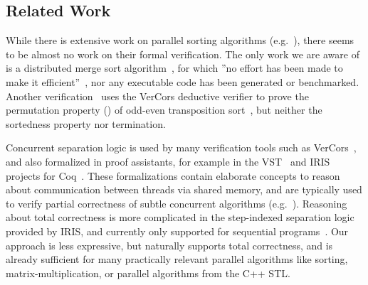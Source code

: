 \documentclass[sn-mathphys,Numbered]{sn-jnl}
\theoremstyle{thmstyleone}%
\theoremstyle{definition}%
\theoremstyle{thmstylethree}%
\begin{document}
%
%
%
%
%
%
%




    \subsection{Related Work}
    While there is extensive work on parallel sorting algorithms (e.g.~\cite{AWFS22,CNLM08,AMI21}),
    there seems to be almost no work on their formal verification. The only work we are aware of is
    a distributed merge sort algorithm~\cite{HKBK20}, for which ''no effort has been made to make it efficient''~\cite[Sec.~2]{HKBK20},
    nor any executable code has been generated or benchmarked. Another verification~\cite{SaHu20} uses
    the VerCors deductive verifier to prove the permutation property ()
    of odd-even transposition sort~\cite{Ha72}, but neither the sortedness property nor termination.

    Concurrent separation logic is used by many verification tools such
    as VerCors~\cite{Vercors}, and also formalized in proof assistants, for example in the VST~\cite{VST}
    and IRIS~\cite{JKJA18} projects for Coq~\cite{BeCa10}. These formalizations contain elaborate concepts to
    reason about communication between threads via shared memory, and are typically used to
    verify partial correctness of subtle concurrent algorithms (e.g.~\cite{MeJo21}).
    Reasoning about total correctness is more complicated in the step-indexed separation logic provided by IRIS,
    and currently only supported for sequential programs~\cite{SGGT21}.
    Our approach is less expressive, but naturally supports total correctness, and is already sufficient for
    many practically relevant parallel algorithms like sorting, matrix-multiplication, or parallel algorithms from
    the C++ STL.
\end{document}
